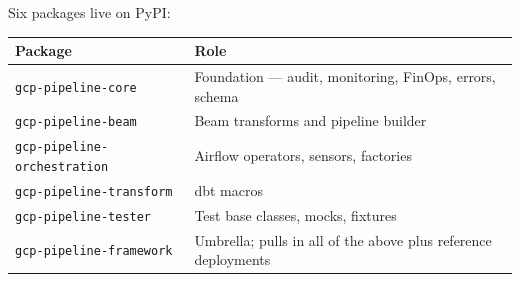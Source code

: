 \documentclass[
  11pt,
  british,
  oneside]{book}
\begin{document}
Six packages live on PyPI:

\begin{longtable}[]{@{}ll@{}}
\toprule
\begin{minipage}[b]{0.47\columnwidth}\raggedright
Package\strut
\end{minipage} & \begin{minipage}[b]{0.47\columnwidth}\raggedright
Role\strut
\end{minipage}\tabularnewline
\midrule
\endhead
\begin{minipage}[t]{0.47\columnwidth}\raggedright
\texttt{gcp-pipeline-core}\strut
\end{minipage} & \begin{minipage}[t]{0.47\columnwidth}\raggedright
Foundation --- audit, monitoring, FinOps, errors, schema\strut
\end{minipage}\tabularnewline
\begin{minipage}[t]{0.47\columnwidth}\raggedright
\texttt{gcp-pipeline-beam}\strut
\end{minipage} & \begin{minipage}[t]{0.47\columnwidth}\raggedright
Beam transforms and pipeline builder\strut
\end{minipage}\tabularnewline
\begin{minipage}[t]{0.47\columnwidth}\raggedright
\texttt{gcp-pipeline-orchestration}\strut
\end{minipage} & \begin{minipage}[t]{0.47\columnwidth}\raggedright
Airflow operators, sensors, factories\strut
\end{minipage}\tabularnewline
\begin{minipage}[t]{0.47\columnwidth}\raggedright
\texttt{gcp-pipeline-transform}\strut
\end{minipage} & \begin{minipage}[t]{0.47\columnwidth}\raggedright
dbt macros\strut
\end{minipage}\tabularnewline
\begin{minipage}[t]{0.47\columnwidth}\raggedright
\texttt{gcp-pipeline-tester}\strut
\end{minipage} & \begin{minipage}[t]{0.47\columnwidth}\raggedright
Test base classes, mocks, fixtures\strut
\end{minipage}\tabularnewline
\begin{minipage}[t]{0.47\columnwidth}\raggedright
\texttt{gcp-pipeline-framework}\strut
\end{minipage} & \begin{minipage}[t]{0.47\columnwidth}\raggedright
Umbrella; pulls in all of the above plus reference deployments\strut
\end{minipage}\tabularnewline
\bottomrule
\end{longtable}
\end{document}
